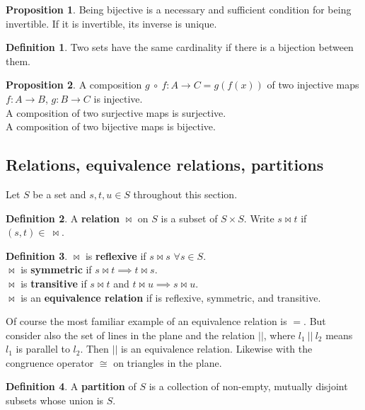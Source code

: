\documentclass{article}
\theoremstyle{definition}
\newtheorem{definition}{Definition}[section]
\newtheorem{proposition}{Proposition}[section]
\begin{document}
\begin{proposition}
Being bijective is a necessary and sufficient condition for being invertible. If it is invertible, its inverse is unique.
\end{proposition}

\begin{definition}
Two sets have the same cardinality if there is a bijection between them.
\end{definition}

\begin{proposition}
A composition $g \ \circ \ f : A \rightarrow C  = g(f(x)) $ of two injective maps $f : A \rightarrow B$, $g: B \rightarrow C$ is injective. \\
A composition of two surjective maps is surjective. \\
A composition of two bijective maps is bijective.
\end{proposition}

\subsection{Relations, equivalence relations, partitions}

Let $S$ be a set and $s, t, u \in S$ throughout this section.

\begin{definition}
A \textbf{relation} $\bowtie$ on $S$ is a subset of $S \times S$. Write $s \bowtie t$ if $(s, t) \in \ \bowtie$.
\end{definition}

\begin{definition}
$\bowtie$ is \textbf{reflexive} if $s \bowtie s$ $\forall s \in S$. \\
$\bowtie$ is \textbf{symmetric} if $s \bowtie t \implies t \bowtie s$. \\
$\bowtie$ is \textbf{transitive} if $s \bowtie t$ and $t \bowtie u \implies s \bowtie u$. \\
$\bowtie$ is an \textbf{equivalence relation} if is reflexive, symmetric, and transitive.
\end{definition}

Of course the most familiar example of an equivalence relation is $=$. But consider also the set of lines in the plane and the relation $||$, where $l_1 \ || \ l_2$ means $l_1$ is parallel to $l_2$. Then $||$ is an equivalence relation. Likewise with the congruence operator $\cong$ on triangles in the plane.

\begin{definition}
A \textbf{partition} of $S$ is a collection of non-empty, mutually disjoint subsets whose union is $S$.
\end{definition}
\end{document}
